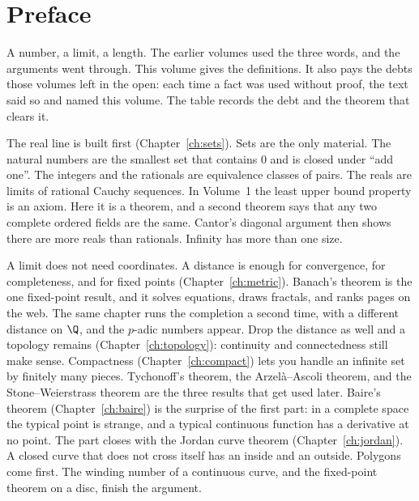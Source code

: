 \chapter*{Preface}
A number, a limit, a length. The earlier volumes used the three words, and the arguments went through. This volume gives the definitions. It also pays the debts those volumes left in the open: each time a fact was used without proof, the text said so and named this volume. The table records the debt and the theorem that clears it.

The real line is built first (Chapter~\ref{ch:sets}). Sets are the only material. The natural numbers are the smallest set that contains $0$ and is closed under ``add one''. The integers and the rationals are equivalence classes of pairs. The reals are limits of rational Cauchy sequences. In Volume~1 the least upper bound property is an axiom. Here it is a theorem, and a second theorem says that any two complete ordered fields are the same. Cantor's diagonal argument then shows there are more reals than rationals. Infinity has more than one size.

A limit does not need coordinates. A distance is enough for convergence, for completeness, and for fixed points (Chapter~\ref{ch:metric}). Banach's theorem is the one fixed-point result, and it solves equations, draws fractals, and ranks pages on the web. The same chapter runs the completion a second time, with a different distance on $\Q$, and the $p$-adic numbers appear. Drop the distance as well and a topology remains (Chapter~\ref{ch:topology}): continuity and connectedness still make sense. Compactness (Chapter~\ref{ch:compact}) lets you handle an infinite set by finitely many pieces. Tychonoff's theorem, the Arzel\`a--Ascoli theorem, and the Stone--Weierstrass theorem are the three results that get used later. Baire's theorem (Chapter~\ref{ch:baire}) is the surprise of the first part: in a complete space the typical point is strange, and a typical continuous function has a derivative at no point. The part closes with the Jordan curve theorem (Chapter~\ref{ch:jordan}). A closed curve that does not cross itself has an inside and an outside. Polygons come first. The winding number of a continuous curve, and the fixed-point theorem on a disc, finish the argument.

